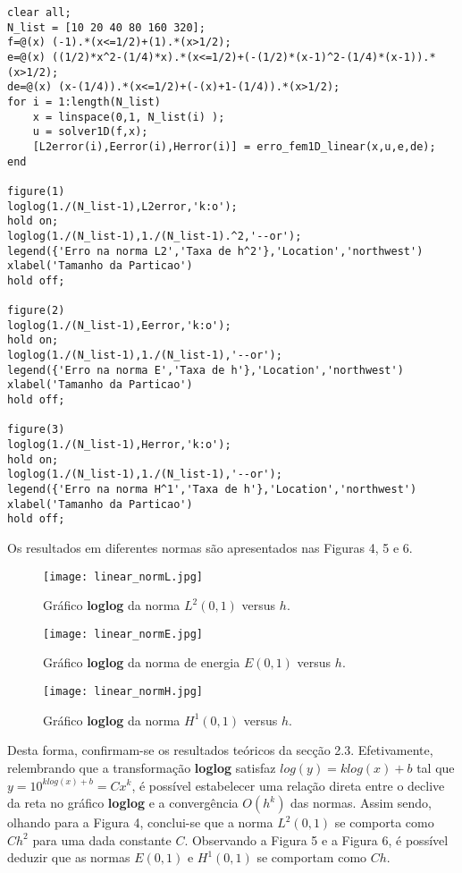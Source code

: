 \documentclass{article}
\theoremstyle{definition}
\theoremstyle{plain}
\numberwithin{equation}{section}
\newcommand{\tab}{\hspace{10mm}}
\begin{document}
\begin{lstlisting}[frame=single]
clear all;
N_list = [10 20 40 80 160 320];
f=@(x) (-1).*(x<=1/2)+(1).*(x>1/2);
e=@(x) ((1/2)*x^2-(1/4)*x).*(x<=1/2)+(-(1/2)*(x-1)^2-(1/4)*(x-1)).*(x>1/2);
de=@(x) (x-(1/4)).*(x<=1/2)+(-(x)+1-(1/4)).*(x>1/2);
for i = 1:length(N_list)
    x = linspace(0,1, N_list(i) );
    u = solver1D(f,x);
    [L2error(i),Eerror(i),Herror(i)] = erro_fem1D_linear(x,u,e,de);
end

figure(1)
loglog(1./(N_list-1),L2error,'k:o');
hold on;
loglog(1./(N_list-1),1./(N_list-1).^2,'--or');
legend({'Erro na norma L2','Taxa de h^2'},'Location','northwest')
xlabel('Tamanho da Particao')
hold off;

figure(2)
loglog(1./(N_list-1),Eerror,'k:o');
hold on;
loglog(1./(N_list-1),1./(N_list-1),'--or');
legend({'Erro na norma E','Taxa de h'},'Location','northwest')
xlabel('Tamanho da Particao')
hold off;

figure(3)
loglog(1./(N_list-1),Herror,'k:o');
hold on;
loglog(1./(N_list-1),1./(N_list-1),'--or');
legend({'Erro na norma H^1','Taxa de h'},'Location','northwest')
xlabel('Tamanho da Particao')
hold off;

\end{lstlisting}
\vspace{5mm}

Os resultados em diferentes normas são apresentados nas Figuras 4, 5 e 6.

\begin{figure}[H]
\centering
\texttt{[image: linear\_normL.jpg]}
\caption{Gráfico \textbf{loglog} da norma $L^2(0,1)$ versus $h$. }
\end{figure}

\begin{figure}[H]
\centering
\texttt{[image: linear\_normE.jpg]}
\caption{Gráfico \textbf{loglog} da norma de energia $E(0,1)$ versus $h$. }
\end{figure}

\begin{figure}[H]
\centering
\texttt{[image: linear\_normH.jpg]}
\caption{Gráfico \textbf{loglog} da norma $H^1(0,1)$ versus $h$.}
\end{figure}

\vspace{1mm}

\tab Desta forma, confirmam-se os resultados teóricos da secção 2.3. Efetivamente, relembrando que a transformação \textbf{loglog} satisfaz $log(y)=klog(x)+b$ tal que $y=10^{klog(x)+b}=Cx^k$, é possível estabelecer uma relação direta entre o declive da reta no gráfico \textbf{loglog} e a convergência $O(h^k)$ das normas. Assim sendo, olhando para a Figura 4, conclui-se que a norma $L^2(0,1)$ se comporta como $Ch^2$ para uma dada constante $C$. Observando a Figura 5 e a Figura 6, é possível deduzir que as normas $E(0,1)$ e $H^1(0,1)$ se comportam como $Ch$.
\end{document}
